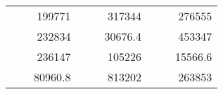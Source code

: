 \begin{table}[H]
\begin{tabular}{|ccrccrccc}
\rowcolor[HTML]{DAE8FC} 
\multicolumn{1}{|c|}{\cellcolor[HTML]{FFFFC7}}                                & \multicolumn{1}{c|}{\cellcolor[HTML]{DAE8FC}}                      & \multicolumn{1}{r|}{\cellcolor[HTML]{DAE8FC}199771}    & \multicolumn{1}{c|}{\cellcolor[HTML]{FFFFC7}}                                & \multicolumn{1}{c|}{\cellcolor[HTML]{DAE8FC}}                       & \multicolumn{1}{r|}{\cellcolor[HTML]{DAE8FC}317344}    & \multicolumn{1}{c|}{\cellcolor[HTML]{FFFFC7}}                                & \multicolumn{1}{c|}{\cellcolor[HTML]{DAE8FC}}                      & \multicolumn{1}{r|}{\cellcolor[HTML]{DAE8FC}276555}    \\ \cline{3-3} \cline{6-6} \cline{9-9} 
\multicolumn{1}{|c|}{\cellcolor[HTML]{FFFFC7}}                                & \multicolumn{1}{c|}{\cellcolor[HTML]{DAE8FC}}                      & \multicolumn{1}{r|}{\cellcolor[HTML]{DDFDFF}232834}    & \multicolumn{1}{c|}{\cellcolor[HTML]{FFFFC7}}                                & \multicolumn{1}{c|}{\cellcolor[HTML]{DAE8FC}}                       & \multicolumn{1}{r|}{\cellcolor[HTML]{DDFDFF}30676.4}   & \multicolumn{1}{c|}{\cellcolor[HTML]{FFFFC7}}                                & \multicolumn{1}{c|}{\cellcolor[HTML]{DAE8FC}}                      & \multicolumn{1}{r|}{\cellcolor[HTML]{DDFDFF}453347}    \\ \cline{3-3} \cline{6-6} \cline{9-9} 
\rowcolor[HTML]{DAE8FC} 
\multicolumn{1}{|c|}{\cellcolor[HTML]{FFFFC7}}                                & \multicolumn{1}{c|}{\cellcolor[HTML]{DAE8FC}}                      & \multicolumn{1}{r|}{\cellcolor[HTML]{DAE8FC}236147}    & \multicolumn{1}{c|}{\cellcolor[HTML]{FFFFC7}}                                & \multicolumn{1}{c|}{\cellcolor[HTML]{DAE8FC}}                       & \multicolumn{1}{r|}{\cellcolor[HTML]{DAE8FC}105226}    & \multicolumn{1}{c|}{\cellcolor[HTML]{FFFFC7}}                                & \multicolumn{1}{c|}{\cellcolor[HTML]{DAE8FC}}                      & \multicolumn{1}{r|}{\cellcolor[HTML]{DAE8FC}15566.6}   \\ \cline{3-3} \cline{6-6} \cline{9-9} 
\multicolumn{1}{|c|}{\cellcolor[HTML]{FFFFC7}}                                & \multicolumn{1}{c|}{\cellcolor[HTML]{DAE8FC}}                      & \multicolumn{1}{r|}{\cellcolor[HTML]{DDFDFF}80960.8}   & \multicolumn{1}{c|}{\cellcolor[HTML]{FFFFC7}}                                & \multicolumn{1}{c|}{\cellcolor[HTML]{DAE8FC}}                       & \multicolumn{1}{r|}{\cellcolor[HTML]{DDFDFF}813202}    & \multicolumn{1}{c|}{\cellcolor[HTML]{FFFFC7}}                                & \multicolumn{1}{c|}{\cellcolor[HTML]{DAE8FC}}                      & \multicolumn{1}{r|}{\cellcolor[HTML]{DDFDFF}263853}    \\ \cline{3-3} \cline{6-6} \cline{9-9} 

\end{tabular}
\end{table}
